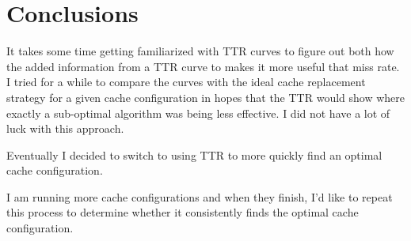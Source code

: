 \section{Conclusions}

It takes some time getting familiarized with TTR curves to figure out both how the added information from a TTR curve to makes it more useful that miss rate. 
I tried for a while to compare the curves with the ideal cache replacement strategy for a given cache configuration in hopes that the TTR would show where exactly a sub-optimal algorithm was being less effective. 
I did not have a lot of luck with this approach.

Eventually I decided to switch to using TTR to more quickly find an optimal cache configuration. 

I am running more cache configurations and when they finish, I'd like to repeat this process to determine whether it consistently finds the optimal cache configuration.